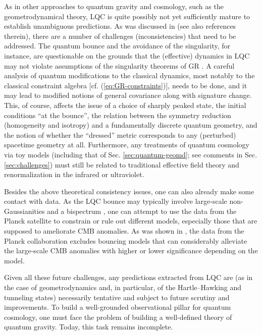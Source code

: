 \documentclass[12pt]{iopart}
\def\eref#1{(\ref{eq:#1})}
\begin{document}
As in other approaches to quantum gravity and cosmology, such as the geometrodynamical theory, LQC is quite possibly not yet sufficiently mature to establish unambiguous predictions. As was discussed in \citet{Bojowald:2021aqx} (see also references therein), there are a number of challenges (inconsistencies) that need to be addressed. The quantum bounce and the avoidance of the singularity, for instance, are questionable on the grounds that the (effective) dynamics in LQC may not violate assumptions of the singularity theorems of GR \citep{Hawking:1996jh,Senovilla:1998oua}. A careful analysis of quantum modifications to the classical dynamics, most notably to the classical constraint algebra [cf. \eref{GR-constraints}], needs to be done, and it may lead to modified notions of general covariance along with signature change. This, of course, affects the issue of a choice of sharply peaked state, the initial conditions ``at the bounce'', the relation between the symmetry reduction (homogeneity and isotropy) and a fundamentally discrete quantum geometry, and the notion of whether the ``dressed'' metric corresponds to any (perturbed) spacetime geometry at all. Furthermore, any treatments of quantum cosmology via toy models (including that of Sec. \ref{sec:quantum-geomd}; see comments in Sec. \ref{sec:challenges}) must still be related to traditional effective field theory and renormalization in the infrared or ultraviolet.

Besides the above theoretical consistency issues, one can also already make some contact with data. As the LQC bounce may typically involve large-scale non-Gaussianities and a bispectrum \citep{Agullo:2017eyh,Agullo:2020wur}, one can attempt to use the data from the Planck satellite to constrain or rule out different models, especially those that are supposed to ameliorate CMB anomalies. As was shown in \citet{vanTent:2022vgy}, the data from the Planck collaboration excludes bouncing models that can considerably alleviate the large-scale CMB anomalies with higher or lower significance depending on the model.

Given all these future challenges, any predictions extracted from LQC are (as in the case of geometrodynamics and, in particular, of the Hartle--Hawking and tunneling states) necessarily tentative and subject to future scrutiny and improvements. To build a well-grounded observational pillar for quantum cosmology, one must face the problem of building a well-defined theory of quantum gravity. Today, this task remains incomplete.
\end{document}
